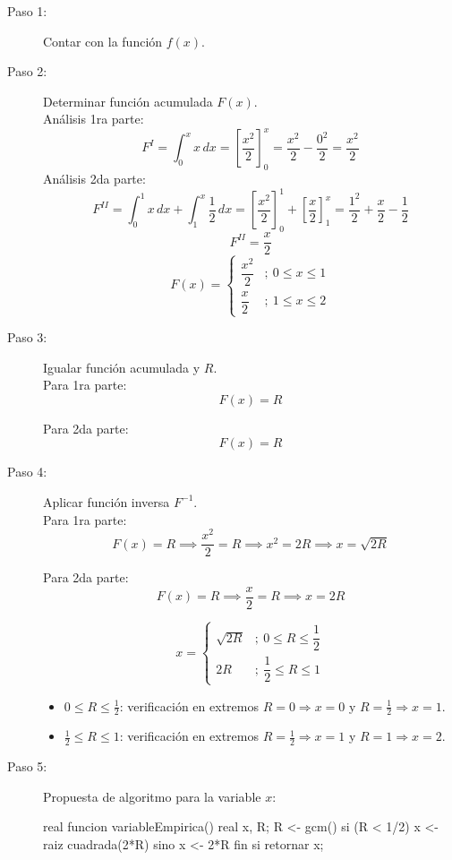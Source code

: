 \documentclass{article}
\begin{document}
\begin{description}
    \item[Paso 1:] Contar con la función $f(x)$.

    \item[Paso 2:] Determinar función acumulada $F(x)$.\\
    Análisis 1ra parte:
    $$ F^I = \int_0^x x\,dx = \left[\frac{x^2}{2}\right]_0^x = \frac{x^2}{2} - \frac{0^2}{2} = \frac{x^2}{2} $$
    Análisis 2da parte:
    $$ F^{II} = \int_0^1 x\,dx + \int_1^x \frac{1}{2}\,dx = \left[\frac{x^2}{2}\right]_0^1 + \left[\frac{x}{2}\right]_1^x = \frac{1^2}{2} + \frac{x}{2} - \frac{1}{2} $$
    $$ F^{II} = \frac{x}{2} $$
    $$F(x)=\begin{cases}\dfrac{x^2}{2} &;\ 0 \leq x \leq 1 \\ \dfrac{x}{2} &;\ 1 \leq x \leq 2\end{cases}$$

    \item[Paso 3:] Igualar función acumulada y $R$.\\
    Para 1ra parte:
    $$ F(x) = R $$
    
    Para 2da parte:
    $$ F(x) = R $$
    

    \item[Paso 4:] Aplicar función inversa $F^{-1}$.\\
    Para 1ra parte:
    $$ F(x) = R \implies \frac{x^2}{2} = R \implies x^2 = 2R \implies x = \sqrt{2R} $$

    Para 2da parte:
    $$ F(x) = R \implies \frac{x}{2} = R \implies x = 2R $$

    $$x=\begin{cases}\sqrt{2R} &;\ 0 \leq R \leq \dfrac{1}{2} \\ 2R &;\ \dfrac{1}{2} \leq R \leq 1\end{cases}$$
    
    \begin{itemize}
        \item $0 \leq R \leq \frac{1}{2}$: verificación en extremos $R=0 \Rightarrow x=0$ y $R=\frac{1}{2} \Rightarrow x=1$.
        \item $\frac{1}{2} \leq R \leq 1$: verificación en extremos $R=\frac{1}{2} \Rightarrow x=1$ y $R=1 \Rightarrow x=2$.
    \end{itemize}

    \item[Paso 5:] Propuesta de algoritmo para la variable $x$:
    \begin{Algoritmo}{}
real funcion variableEmpirica(){
    real x, R;
    R <- gcm()
    si (R < 1/2)
        x <- raiz cuadrada(2*R)
    sino
        x <- 2*R
    fin si
    retornar x;
}
    \end{Algoritmo}
\end{description}
\end{document}
